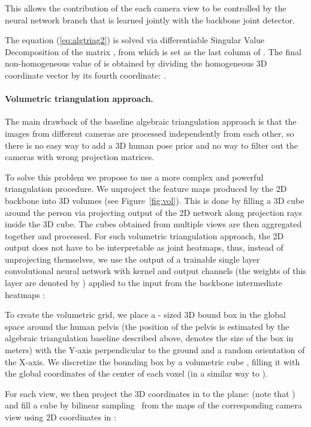 \documentclass[10pt,twocolumn,letterpaper]{article}
\newcommand{\fig}[1]{Figure~\ref{fig:#1}}
\newcommand{\eq}[1]{(\ref{eq:#1})}
\begin{document}
This allows the contribution of the each camera view to be controlled by the neural network branch that is learned jointly with the backbone joint detector.

The equation \eq{algtriag2} is solved via differentiable Singular Value Decomposition of the matrix , from which  is set as the last column of .
The final non-homogeneous value of  is obtained by dividing the homogeneous 3D coordinate vector  by its fourth coordinate: .




\paragraph{Volumetric triangulation approach.}
The main drawback of the baseline algebraic triangulation approach is that the images  from different cameras are processed independently from each other, so there is no easy way to add a 3D human pose prior and no way to filter out the cameras with wrong projection matrices. 

To solve this problem we propose to use a more complex and powerful triangulation procedure. We unproject the feature maps produced by the 2D backbone into 3D volumes (see \fig{vol}). This is done by filling a 3D cube around the person via projecting output of the 2D network along projection rays inside the 3D cube. The cubes obtained from multiple views are then aggregated together and processed. For such volumetric triangulation approach, the 2D output does not have to be interpretable as joint heatmaps, thus, instead of unprojecting  themselves, we use the output of a trainable single layer convolutional neural network  with  kernel and  output channels (the weights of this layer are denoted by ) applied to the input from the backbone intermediate heatmaps :

To create the volumetric grid, we place a  - sized 3D bound box in the global space around the human pelvis (the position of the pelvis is estimated by the algebraic triangulation baseline described above,  denotes the size of the box in meters) with the Y-axis perpendicular to the ground and a random orientation of the X-axis. We discretize the bounding box by a volumetric cube , filling it with the global coordinates of the center of each voxel (in a similar way to \cite{Joo_2017_TPAMI}).


For each view, we then project the 3D coordinates in  to the plane:  (note that ) and fill a cube  by bilinear sampling~\cite{jaderberg2015spatial} from the maps  of the corresponding camera view using 2D coordinates in : 
\end{document}
